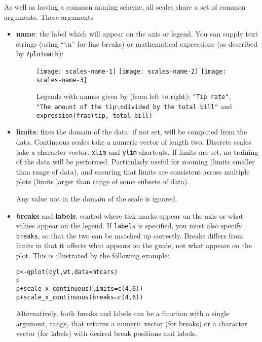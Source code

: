 As well as having a common naming scheme, all scales share a set of common arguments.  These arguments 

\begin{itemize}
  \item {\bf name}:  the label which will appear on the axis or legend. You can supply text strings (using ``$\backslash$n'' for line breaks) or mathematical expressions (as described by \verb|?plotmath|):
  
  \begin{figure}[htbp]
    \centering
      \texttt{[image: scales-name-1]}
      \texttt{[image: scales-name-2]}
      \texttt{[image: scales-name-3]}
    \caption{Legends with names given by (from left to right): {\tt "Tip rate"}, {\tt "The amount of the tip$\backslash$ndivided by the total bill"} and {\tt expression(frac(tip, total\_bill)} }
    \label{fig:label}
  \end{figure}
  

  \item {\bf limits}: fixes the domain of the data.  if not set, will be computed from the data.    Continuous scales take a numeric vector of length two.  Discrete scales take a character vector.  {\tt xlim} and {\tt ylim} shortcuts.  If limits are set, no training of the data will be performed.  Particularly useful for zooming (limits smaller than range of data), and ensuring that limits are consistent across multiple plots (limits larger than range of some subsets of data).  
  
  Any value not in the domain of the scale is ignored.

  \item {\bf breaks} and {\bf labels}: control where tick marks appear on the axis or what values appear on the legend.  If {\tt labels} is specified, you must also specify {\tt breaks}, so that the two can be matched up correctly.  Breaks differs from limits in that it affects what appears on the guide, not what appears on the plot.  This is illustrated by the following example:
  
  \begin{alltt}
    p <- qplot(cyl, wt, data = mtcars)
    p
    p + scale_x_continuous(limits = c(4, 6))
    p + scale_x_continuous(breaks = c(4, 6))
  \end{alltt}
  
  Alternatively, both breaks and labels can be a function with a single  argument, range, that returns a numeric vector (for breaks) or a character vector (for labels) with desired break positions and labels.
\end{itemize}


